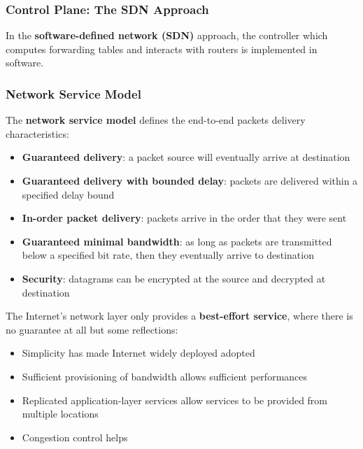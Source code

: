\documentclass{article}
\begin{document}
\subsubsection*{Control Plane: The SDN Approach}
In the \textbf{software-defined network (SDN)} approach, the controller which computes forwarding tables and interacts with routers is implemented in software.
\subsubsection{Network Service Model}
The \textbf{network service model} defines the end-to-end packets delivery characteristics:
\begin{itemize}
    \item \textbf{Guaranteed delivery}: a packet source will eventually arrive at destination
    \item \textbf{Guaranteed delivery with bounded delay}: packets are delivered within a specified delay bound
    \item \textbf{In-order packet delivery}: packets arrive in the order that they were sent
    \item \textbf{Guaranteed minimal bandwidth}: as long as packets are transmitted below a specified bit rate, then they eventually arrive to destination
    \item \textbf{Security}: datagrams can be encrypted at the source and decrypted at destination
\end{itemize}
The Internet's network layer only provides a \textbf{best-effort service}, where there is no guarantee at all but some reflections:
\begin{itemize}
    \item Simplicity has made Internet widely deployed adopted
    \item Sufficient provisioning of bandwidth allows sufficient performances
    \item Replicated application-layer services allow services to be provided from multiple locations
    \item Congestion control helps
\end{itemize}
\end{document}
